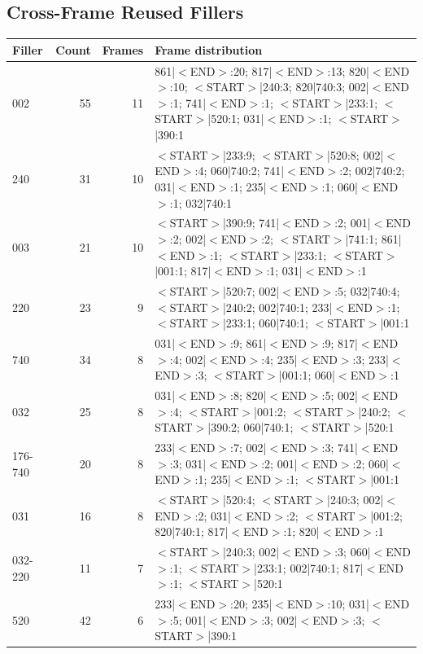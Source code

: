 \documentclass[11pt,a4paper]{article}
\begin{document}
\subsection*{Cross-Frame Reused Fillers}
\begin{center}
\begin{tabular}{lrrp{}}
\toprule
\textbf{Filler} & \textbf{Count} & \textbf{Frames} & \textbf{Frame distribution} \\
\midrule
002 & 55 & 11 & 861|$<$END$>$:20; 817|$<$END$>$:13; 820|$<$END$>$:10; $<$START$>$|240:3; 820|740:3; 002|$<$END$>$:1; 741|$<$END$>$:1; $<$START$>$|233:1; $<$START$>$|520:1; 031|$<$END$>$:1; $<$START$>$|390:1 \\
240 & 31 & 10 & $<$START$>$|233:9; $<$START$>$|520:8; 002|$<$END$>$:4; 060|740:2; 741|$<$END$>$:2; 002|740:2; 031|$<$END$>$:1; 235|$<$END$>$:1; 060|$<$END$>$:1; 032|740:1 \\
003 & 21 & 10 & $<$START$>$|390:9; 741|$<$END$>$:2; 001|$<$END$>$:2; 002|$<$END$>$:2; $<$START$>$|741:1; 861|$<$END$>$:1; $<$START$>$|233:1; $<$START$>$|001:1; 817|$<$END$>$:1; 031|$<$END$>$:1 \\
220 & 23 & 9 & $<$START$>$|520:7; 002|$<$END$>$:5; 032|740:4; $<$START$>$|240:2; 002|740:1; 233|$<$END$>$:1; $<$START$>$|233:1; 060|740:1; $<$START$>$|001:1 \\
740 & 34 & 8 & 031|$<$END$>$:9; 861|$<$END$>$:9; 817|$<$END$>$:4; 002|$<$END$>$:4; 235|$<$END$>$:3; 233|$<$END$>$:3; $<$START$>$|001:1; 060|$<$END$>$:1 \\
032 & 25 & 8 & 031|$<$END$>$:8; 820|$<$END$>$:5; 002|$<$END$>$:4; $<$START$>$|001:2; $<$START$>$|240:2; $<$START$>$|390:2; 060|740:1; $<$START$>$|520:1 \\
176-740 & 20 & 8 & 233|$<$END$>$:7; 002|$<$END$>$:3; 741|$<$END$>$:3; 031|$<$END$>$:2; 001|$<$END$>$:2; 060|$<$END$>$:1; 235|$<$END$>$:1; $<$START$>$|001:1 \\
031 & 16 & 8 & $<$START$>$|520:4; $<$START$>$|240:3; 002|$<$END$>$:2; 031|$<$END$>$:2; $<$START$>$|001:2; 820|740:1; 817|$<$END$>$:1; 820|$<$END$>$:1 \\
032-220 & 11 & 7 & $<$START$>$|240:3; 002|$<$END$>$:3; 060|$<$END$>$:1; $<$START$>$|233:1; 002|740:1; 817|$<$END$>$:1; $<$START$>$|520:1 \\
520 & 42 & 6 & 233|$<$END$>$:20; 235|$<$END$>$:10; 031|$<$END$>$:5; 001|$<$END$>$:3; 002|$<$END$>$:3; $<$START$>$|390:1 \\
\bottomrule
\end{tabular}
\end{center}
\end{document}
